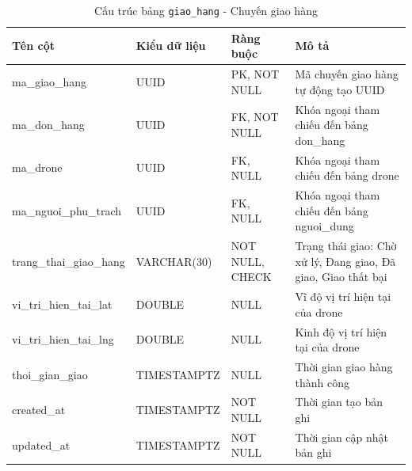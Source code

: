 \begin{table}[H]
  \centering
  \begin{tabularx}{\textwidth}{|l|l|l|>{\raggedright\arraybackslash}X|}
    \hline
    \textbf{Tên cột} & \textbf{Kiểu dữ liệu} & \textbf{Ràng buộc} & \textbf{Mô tả} \\
    \hline
    ma\_giao\_hang       & UUID            & PK, NOT NULL    & Mã chuyến giao hàng tự động tạo UUID \\ \hline
    ma\_don\_hang        & UUID            & FK, NOT NULL    & Khóa ngoại tham chiếu đến bảng don\_hang \\ \hline
    ma\_drone            & UUID            & FK, NULL        & Khóa ngoại tham chiếu đến bảng drone \\ \hline
    ma\_nguoi\_phu\_trach & UUID            & FK, NULL        & Khóa ngoại tham chiếu đến bảng nguoi\_dung \\ \hline
    trang\_thai\_giao\_hang & VARCHAR(30)     & NOT NULL, CHECK & Trạng thái giao: Chờ xử lý, Đang giao, Đã giao, Giao thất bại \\ \hline
    vi\_tri\_hien\_tai\_lat & DOUBLE          & NULL            & Vĩ độ vị trí hiện tại của drone \\ \hline
    vi\_tri\_hien\_tai\_lng & DOUBLE          & NULL            & Kinh độ vị trí hiện tại của drone \\ \hline
    thoi\_gian\_giao     & TIMESTAMPTZ     & NULL            & Thời gian giao hàng thành công \\ \hline
    created\_at          & TIMESTAMPTZ     & NOT NULL        & Thời gian tạo bản ghi \\ \hline
    updated\_at          & TIMESTAMPTZ     & NOT NULL        & Thời gian cập nhật bản ghi \\
    \hline
  \end{tabularx}
  \caption{Cấu trúc bảng \texttt{giao\_hang} - Chuyến giao hàng}
  \label{tab:db-giao-hang}
\end{table}

